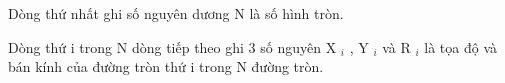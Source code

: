 Dòng thứ nhất ghi số nguyên dương N là số hình tròn.  

   Dòng thứ i trong N dòng tiếp theo ghi 3 số nguyên X   $_    i   $   , Y   $_    i   $   và R   $_    i   $   là tọa độ và bán kính của đường tròn thứ i trong N đường tròn.